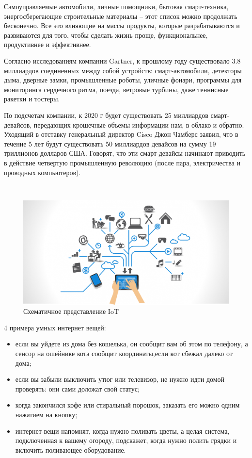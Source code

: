 Самоуправляемые автомобили, личные помощники, бытовая смарт-техника, энергосберегающие строительные материалы – этот список можно продолжать бесконечно. Все это влияющие на массы продукты, которые разрабатываются и развиваются для того, чтобы сделать жизнь проще, функциональнее, продуктивнее и эффективнее.

Согласно исследованиям компании Gartner, к прошлому году существовало 3.8 миллиардов соединенных между собой устройств: смарт-автомобили, детекторы дыма, дверные замки, промышленные роботы, уличные фонари, программы для мониторинга сердечного ритма, поезда, ветровые турбины, даже теннисные ракетки и тостеры.

По подсчетам компании, к 2020 г будет существовать 25 миллиардов смарт-девайсов, передающих крошечные объемы информации нам, в облако и обратно. Уходящий в отставку генеральный директор Cisco Джон Чамберс заявил, что в течение 5 лет будут существовать 50 миллиардов девайсов на сумму 19 триллионов долларов США. Говорят, что эти смарт-девайсы начинают приводить в действие четвертую промышленную революцию (после пара, электричества и проводных компьютеров).

~
\begin{figure}[H]
\centering
	\includegraphics[scale=0.4]{figures/iot_scheme.png}
	\caption{Схематичное представление IoT}
	\label{fig:subject:iot:scheme}
\end{figure}

4 примера умных интернет вещей:
\begin{itemize}
	\item если вы уйдете из дома без кошелька, он сообщит вам об этом по телефону, а сенсор на ошейнике кота сообщит координаты,если кот сбежал далеко от дома;
	\item если вы забыли выключить утюг или телевизор, не нужно идти домой проверять: они сами доложат свой статус;
	\item когда закончился кофе или стиральный порошок, заказать его можно одним нажатием на кнопку;
	\item интернет-вещи напомнят, когда нужно поливать цветы, а целая система, подключенная к вашему огороду, подскажет, когда нужно полить грядки и включить поливающее оборудование.
\end{itemize}

